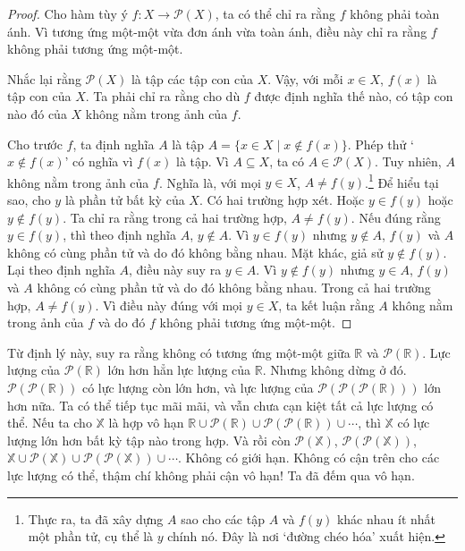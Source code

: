 \begin{proof}
Cho hàm tùy ý $f\colon X \to \mathcal{P}(X)$, ta có thể chỉ ra rằng $f$ không phải toàn ánh. Vì tương ứng một-một vừa đơn ánh vừa toàn ánh, điều này chỉ ra rằng $f$ không phải tương ứng một-một.

Nhắc lại rằng $\mathcal{P}(X)$ là tập các tập con của $X$. Vậy, với mỗi $x \in X$, $f(x)$ là tập con của $X$. Ta phải chỉ ra rằng cho dù $f$ được định nghĩa thế nào, có tập con nào đó của $X$ không nằm trong ảnh của $f$.

Cho trước $f$, ta định nghĩa $A$ là tập $A = \{x \in X \mid x \notin f(x)\}$. Phép thử `$x \notin f(x)$' có nghĩa vì $f(x)$ là tập. Vì $A \subseteq X$, ta có $A \in \mathcal{P}(X)$. Tuy nhiên, $A$ không nằm trong ảnh của $f$. Nghĩa là, với mọi $y \in X$, $A \neq f(y)$.\footnote{Thực ra, ta đã xây dựng $A$ sao cho các tập $A$ và $f(y)$ khác nhau ít nhất một phần tử, cụ thể là $y$ chính nó. Đây là nơi `đường chéo hóa' xuất hiện.} Để hiểu tại sao, cho $y$ là phần tử bất kỳ của $X$. Có hai trường hợp xét. Hoặc $y \in f(y)$ hoặc $y \notin f(y)$. Ta chỉ ra rằng trong cả hai trường hợp, $A \neq f(y)$. Nếu đúng rằng $y \in f(y)$, thì theo định nghĩa $A$, $y \notin A$. Vì $y \in f(y)$ nhưng $y \notin A$, $f(y)$ và $A$ không có cùng phần tử và do đó không bằng nhau. Mặt khác, giả sử $y \notin f(y)$. Lại theo định nghĩa $A$, điều này suy ra $y \in A$. Vì $y \notin f(y)$ nhưng $y \in A$, $f(y)$ và $A$ không có cùng phần tử và do đó không bằng nhau. Trong cả hai trường hợp, $A \neq f(y)$. Vì điều này đúng với mọi $y \in X$, ta kết luận rằng $A$ không nằm trong ảnh của $f$ và do đó $f$ không phải tương ứng một-một.
\end{proof}

Từ định lý này, suy ra rằng không có tương ứng một-một giữa $\mathbb{R}$ và $\mathcal{P}(\mathbb{R})$. Lực lượng của $\mathcal{P}(\mathbb{R})$ lớn hơn hẳn lực lượng của $\mathbb{R}$. Nhưng không dừng ở đó. $\mathcal{P}(\mathcal{P}(\mathbb{R}))$ có lực lượng còn lớn hơn, và lực lượng của $\mathcal{P}(\mathcal{P}(\mathcal{P}(\mathbb{R})))$ lớn hơn nữa. Ta có thể tiếp tục mãi mãi, và vẫn chưa cạn kiệt tất cả lực lượng có thể. Nếu ta cho $\mathbb{X}$ là hợp vô hạn $\mathbb{R} \cup \mathcal{P}(\mathbb{R}) \cup \mathcal{P}(\mathcal{P}(\mathbb{R})) \cup \cdots$, thì $\mathbb{X}$ có lực lượng lớn hơn bất kỳ tập nào trong hợp. Và rồi còn $\mathcal{P}(\mathbb{X})$, $\mathcal{P}(\mathcal{P}(\mathbb{X}))$, $\mathbb{X} \cup \mathcal{P}(\mathbb{X}) \cup \mathcal{P}(\mathcal{P}(\mathbb{X})) \cup \cdots$. Không có giới hạn. Không có cận trên cho các lực lượng có thể, thậm chí không phải cận vô hạn! Ta đã đếm qua vô hạn.

